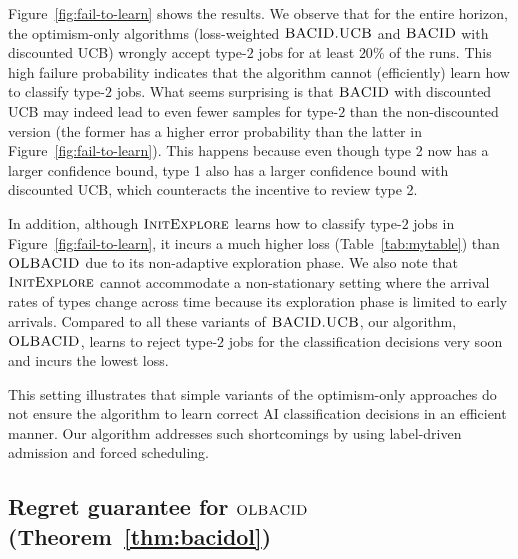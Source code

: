 Figure~\ref{fig:fail-to-learn} shows the results. We observe that for the entire horizon, the optimism-only algorithms (loss-weighted $\textsc{BACID.UCB}$ and $\textsc{BACID}$ with discounted UCB) wrongly accept type-$2$ jobs for at least $20\%$ of the runs. This high failure probability indicates that the algorithm cannot (efficiently) learn how to classify type-$2$ jobs. What seems surprising is that $\textsc{BACID}$ with discounted UCB  may indeed lead to even fewer samples for type-$2$ than the non-discounted version (the former has a higher error probability than the latter in Figure~\ref{fig:fail-to-learn}). This happens because even though type 2 now has a larger confidence bound, type 1 also has a larger confidence bound with discounted UCB, which counteracts the incentive to review type 2.

In addition, although $\textsc{InitExplore}$ learns how to classify type-$2$ jobs in Figure~\ref{fig:fail-to-learn}, it incurs a much higher loss (Table~\ref{tab:mytable}) than $\textsc{OLBACID}$ due to its non-adaptive exploration phase. We also note that $\textsc{InitExplore}$ cannot accommodate a non-stationary setting where the arrival rates of types change across time because its exploration phase is limited to early arrivals. Compared to all these variants of $\textsc{BACID.UCB}$, our algorithm, $\textsc{OLBACID}$, learns to reject type-$2$ jobs for the classification decisions very soon and incurs the lowest loss.

This setting illustrates that simple variants of the optimism-only approaches do not ensure the algorithm to learn correct AI classification decisions in an efficient manner. Our algorithm addresses such shortcomings by using label-driven admission and forced scheduling.

\subsection{Regret guarantee for $\textsc{OLBACID}$ (Theorem~\ref{thm:bacidol})}\label{app:thm-bacidol}

